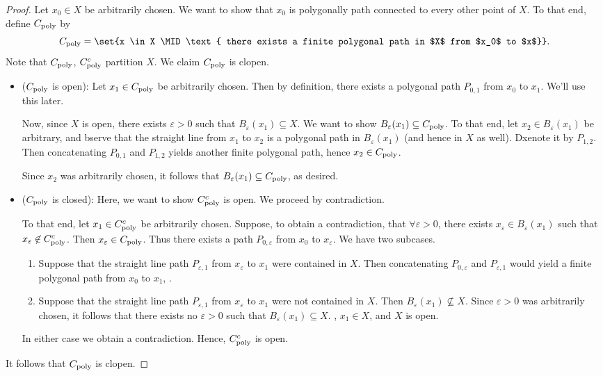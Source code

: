 \begin{proof}
  Let $x_0 \in X$ be arbitrarily chosen. We want to show that $x_0$ is
  polygonally path connected to every other point of $X$. To that end,
  define $C_{\rm poly}$ by
  \[
    C_{\rm poly} = \set{x \in X \MID \text{ there exists a finite
        polygonal path in $X$ from $x_0$ to $x$}}.
  \]
  Note that $C_{\rm poly}$, $C_{\rm poly}^c$ partition $X$. We claim
  $C_{\rm poly}$ is clopen.
  \begin{itemize}
    \item ($C_{\rm poly}$ is open): Let $x_1 \in C_{\rm poly}$ be
      arbitrarily chosen. Then by definition, there exists a polygonal
      path $P_{0,1}$ from $x_0$ to $x_1$. We'll use this later.

      Now, since $X$ is open, there exists $\varepsilon > 0$ such that
      $B_{\varepsilon}(x_1) \subseteq X$. We want to show
      $B_{\varepsilon}(x_1) \subseteq C_{\rm poly}$. To that end, let
      $x_2 \in B_{\varepsilon}(x_1)$ be arbitrary, and bserve that the
      straight line from $x_1$ to $x_2$ is a polygonal path in
      $B_{\varepsilon}(x_1)$ (and hence in $X$ as well). Dxenote it by
      $P_{1,2}$. Then concatenating $P_{0,1}$ and $P_{1,2}$ yields
      another finite polygonal path, hence $x_2 \in C_{\rm poly}$.

      Since $x_2$ was arbitrarily chosen, it follows that
      $B_{\varepsilon}(x_1) \subseteq C_{\rm poly}$, as desired.
    \item ($C_{\rm poly}$ is closed): Here, we want to show $C_{\rm
      poly}^c$ is open. We proceed by contradiction.

      To that end, let $x_1 \in C_{\rm poly}^c$ be
      arbitrarily chosen. Suppose, to obtain a contradiction, that
      $\forall \varepsilon >0$, there exists $x_\varepsilon \in
      B_{\varepsilon}(x_1)$ such that $x_\varepsilon \not\in C_{\rm
      poly}^c$. Then $x_\varepsilon \in C_{\rm poly}$. Thus there
      exists a path $P_{0, \varepsilon}$ from $x_0$ to
      $x_\varepsilon$. We have two subcases.
      \begin{enumerate}
        \item Suppose that the straight line path $P_{\varepsilon, 1}$
          from $x_\varepsilon$ to $x_1$ were contained in $X$. Then
          concatenating $P_{0,\varepsilon}$ and $P_{\varepsilon, 1}$
          would yield a finite polygonal path from $x_0$ to $x_1$,
          \jiong.
        \item Suppose that the straight line path $P_{\varepsilon, 1}$
          from $x_\varepsilon$ to $x_1$ were not contained in $X$.
          Then $B_\varepsilon(x_1) \not\subseteq X$. Since
          $\varepsilon > 0$ was arbitrarily chosen, it follows that
          there exists no $\varepsilon > 0$ such that
          $B_\varepsilon(x_1) \subseteq X$. \jiong, $x_1 \in X$, and
          $X$ is open.
      \end{enumerate}
      In either case we obtain a contradiction. Hence, $C_{\rm
      poly}^c$ is open.
  \end{itemize}
  It follows that $C_{\rm poly}$ is clopen.


\end{proof}
